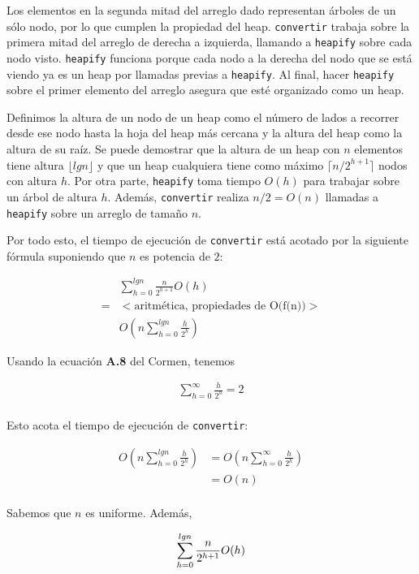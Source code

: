 \documentclass{article}
\begin{document}
Los
elementos en la segunda mitad del arreglo dado representan árboles de un sólo
nodo, por lo que cumplen la propiedad del heap.
\texttt{convertir} trabaja sobre la primera mitad del arreglo de derecha a
izquierda, llamando a \texttt{heapify} sobre cada nodo visto. \texttt{heapify}
funciona porque cada nodo a la derecha del nodo que se está viendo ya es un heap
por llamadas previas a \texttt{heapify}. Al final, hacer \texttt{heapify} sobre
el primer elemento del arreglo asegura que esté organizado como un heap.

Definimos la altura de un nodo de un heap como el número de lados a recorrer
desde ese nodo hasta la hoja del heap más cercana y la altura del heap como la
altura de su raíz. Se puede demostrar que la altura de un heap con $n$ elementos
tiene altura $\lfloor lg n\rfloor$ y que un heap cualquiera tiene como máximo
$\lceil n / 2^{h+1} \rceil$ nodos con altura $h$. Por otra parte,
\texttt{heapify} toma tiempo $O(h)$ para trabajar sobre un árbol de altura $h$.
Además, \texttt{convertir} realiza $n/2 = O(n)$ llamadas a \texttt{heapify}
sobre un arreglo de tamaño $n$.

Por todo esto, el tiempo de ejecución de \texttt{convertir} está acotado por la
siguiente fórmula suponiendo que $n$ es potencia de $2$:

\begin{align*}
 & \sum_{h=0}^{lg n} \frac{n}{2^{h+1}} O(h) \\
 = & <\text{aritmética, propiedades de O(f(n))}> \\
 & O(n \sum_{h=0}^{lg n} \frac{h}{2^{h}})
\end{align*}

Usando la ecuación {\bf A.8} del Cormen, tenemos

\begin{align*}
 \sum_{h=0}^{\infty} \frac{h}{2^h} = 2 \\
\end{align*}

Esto acota el tiempo de ejecución de \texttt{convertir}:

\begin{align*}
 O(n \sum_{h=0}^{lg n} \frac{h}{2^{h}}) &= O(n \sum_{h=0}^{\infty} \frac{h}{2^h}) \\
 &= O(n) \\
\end{align*}

Sabemos que $n$ es uniforme. Además,

\begin{equation}
 \sum_{h=0}^{lg n} \frac{n}{2^{h+1}} O(h) \\
\end{equation}
\end{document}
